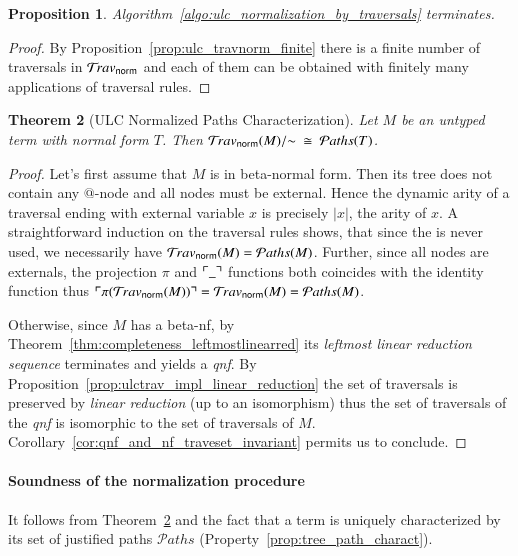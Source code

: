 \documentclass{elsarticle}
\theoremstyle{plain}
\newtheorem{theorem}{Theorem}[section]
\newtheorem{proposition}[theorem]{Proposition}
\theoremstyle{definition}
\newcommand{\normalizing}{{\sf norm}}
\newcommand{\travsetnorm}{\travset_\normalizing}
\newcommand{\travulc}{\travset}
\def\coresymbol{\pi} %
\newcommand{\core}[1]{\coresymbol(#1)} %
\newcommand\pathset{{\mathcal{P}aths}} %
\begin{document}
\begin{proposition}
Algorithm~\ref{algo:ulc_normalization_by_traversals} terminates.
\end{proposition}
\begin{proof}
By Proposition~\ref{prop:ulc_travnorm_finite} there is a finite number of traversals in $\travsetnorm$ and each of them can be obtained with finitely many applications of traversal rules.
\end{proof}

\begin{theorem}[ULC Normalized Paths Characterization]
\label{thm:path_charact_ulc}
Let $M$ be an untyped term with normal form $T$. Then
$\travsetnorm(M)/{\sim} \ \cong\ \pathset(T)$.
\end{theorem}
\begin{proof}
Let's first assume that $M$ is in beta-normal form. Then its tree does not contain any $@$-node and all nodes must be external.
Hence the dynamic arity of a traversal ending with external variable $x$ is precisely $|x|$, the arity of $x$. A straightforward induction on the traversal
rules shows, that since the  is never used, we necessarily have  $\travsetnorm(M) = \pathset(M)$. Further, since all nodes are externals, the projection $\coresymbol$ and $\ulcorner \_ \urcorner$ functions both coincides with the identity function thus $\pview{\core{\travsetnorm(M)}} = \travsetnorm(M) = \pathset(M)$.

Otherwise, since $M$ has a beta-nf, by Theorem~\ref{thm:completeness_leftmostlinearred} its \emph{leftmost linear reduction sequence} terminates and yields a \emph{qnf}. By Proposition~\ref{prop:ulctrav_impl_linear_reduction} the set of traversals is preserved by \emph{linear reduction} (up to an isomorphism) thus the set of traversals of the \emph{qnf} is isomorphic to the set of traversals of $M$. Corollary~\ref{cor:qnf_and_nf_traveset_invariant} permits us to conclude.
\end{proof}

\paragraph{Soundness of the normalization procedure} It follows from Theorem~\ref{thm:path_charact_ulc} and the fact that a term is uniquely characterized by its set of justified paths $\pathset$ (Property~\ref{prop:tree_path_charact}).

\end{document}
